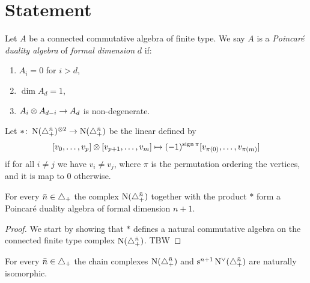 
\section{Statement} \label{s:statement}


\begin{definition}
	Let $A$ be a connected commutative algebra of finite type.
	We say $A$ is a \textit{Poincar\'e duality algebra} of \textit{formal dimension} $d$ if:
	\begin{enumerate}
		\item $A_i = 0$ for $i > d$,
		\item $\dim A_d = 1$,
		\item $A_i \otimes A_{d-i} \to A_d$ is non-degenerate.
	\end{enumerate}
\end{definition}

\begin{definition}
	Let $\ast \colon \operatorname{N}(\triangle_{+}^{\bar{n}})^{\otimes 2} \to \operatorname{N}(\triangle_{+}^{\bar{n}})$ be the linear defined by
	\[
	[v_0, \dots, v_p] \otimes [v_{p+1},\dots,v_{m}] \mapsto
	(-1)^{\operatorname{sign} \pi}[v_{\pi(0)}, \dots, v_{\pi(m)}]
	\]
	if for all $i \neq j$ we have $v_i \neq v_j$, where $\pi$ is the permutation ordering the vertices, and it is map to $0$ otherwise.
\end{definition}

\begin{theorem}
	For every $\bar{n} \in \triangle_{+}$ the complex $\operatorname{N}(\triangle_{+}^{\bar{n}})$ together with the product $\ast$ form a Poincar\'e duality algebra of formal dimension $n+1$.
\end{theorem}

\begin{proof}
	We start by showing that $\ast$ defines a natural commutative algebra on the connected finite type complex $\operatorname{N}(\triangle_{+}^{\bar{n}})$.
	TBW
\end{proof}

\begin{corollary}
	For every $\bar{n} \in \triangle_{+}$ the chain complexes $\operatorname{N}(\triangle_{+}^{\bar{n}})$ and $\mathrm{s}^{n+1}\operatorname{N^{\vee}}(\triangle_{+}^{\bar{n}})$ are naturally isomorphic.
\end{corollary}
